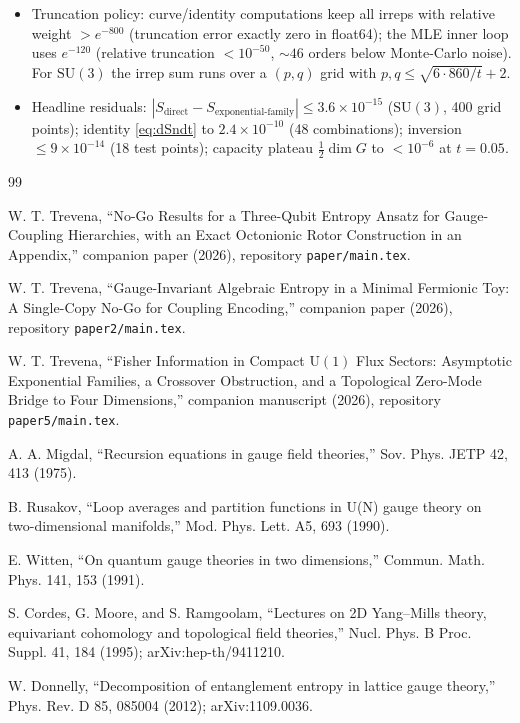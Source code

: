 \documentclass[11pt]{article}
\theoremstyle{remark}
\theoremstyle{plain}
\newcommand{\dG}{\dim G}
\begin{document}
\begin{itemize}
\item Truncation policy: curve/identity computations keep all irreps with relative weight $> e^{-800}$ (truncation error exactly zero in float64); the MLE inner loop uses $e^{-120}$ (relative truncation $< 10^{-50}$, ${\sim}46$ orders below Monte-Carlo noise). For $\mathrm{SU}(3)$ the irrep sum runs over a $(p,q)$ grid with $p, q \leq \sqrt{6 \cdot 860 / t} + 2$.
\item Headline residuals: $|S_{\text{direct}} - S_{\text{exponential-family}}| \leq 3.6\times10^{-15}$ ($\mathrm{SU}(3)$, 400 grid points); identity \eqref{eq:dSndt} to $2.4\times10^{-10}$ (48 combinations); inversion $\leq 9\times10^{-14}$ (18 test points); capacity plateau $\tfrac12\dG$ to $< 10^{-6}$ at $t = 0.05$.
\end{itemize}

\begin{thebibliography}{99}

 W. T. Trevena, ``No-Go Results for a Three-Qubit Entropy Ansatz for Gauge-Coupling Hierarchies, with an Exact Octonionic Rotor Construction in an Appendix,'' companion paper (2026), repository \texttt{paper/main.tex}.

 W. T. Trevena, ``Gauge-Invariant Algebraic Entropy in a Minimal Fermionic Toy: A Single-Copy No-Go for Coupling Encoding,'' companion paper (2026), repository \texttt{paper2/main.tex}.

 W. T. Trevena, ``Fisher Information in Compact $\mathrm{U}(1)$ Flux Sectors: Asymptotic Exponential Families, a Crossover Obstruction, and a Topological Zero-Mode Bridge to Four Dimensions,'' companion manuscript (2026), repository \texttt{paper5/main.tex}.

 A. A. Migdal, ``Recursion equations in gauge field theories,'' Sov. Phys. JETP 42, 413 (1975).

 B. Rusakov, ``Loop averages and partition functions in U(N) gauge theory on two-dimensional manifolds,'' Mod. Phys. Lett. A5, 693 (1990).

 E. Witten, ``On quantum gauge theories in two dimensions,'' Commun. Math. Phys. 141, 153 (1991).

 S. Cordes, G. Moore, and S. Ramgoolam, ``Lectures on 2D Yang--Mills theory, equivariant cohomology and topological field theories,'' Nucl. Phys. B Proc. Suppl. 41, 184 (1995); arXiv:hep-th/9411210.

 W. Donnelly, ``Decomposition of entanglement entropy in lattice gauge theory,'' Phys. Rev. D 85, 085004 (2012); arXiv:1109.0036.


\end{thebibliography}
\end{document}
